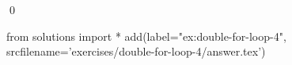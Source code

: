 
    \begin{ex}
  \label{ex:double-for-loop-4}
  
  \qed
\end{ex}
\begin{python0}
from solutions import *
add(label="ex:double-for-loop-4",
    srcfilename='exercises/double-for-loop-4/answer.tex') 
\end{python0}                              
